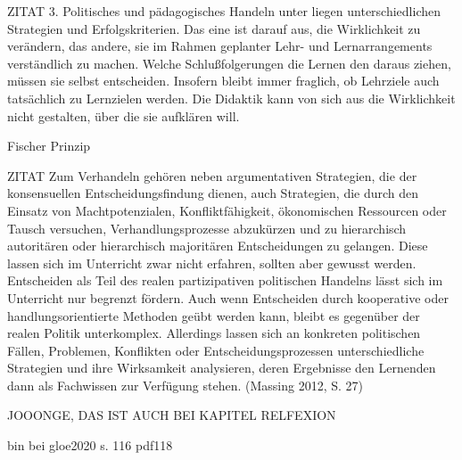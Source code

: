 ZITAT
3. Politisches und pädagogisches Handeln unter liegen unterschiedlichen Strategien und Erfolgskriterien. Das eine ist darauf aus, die Wirklichkeit zu verändern, das andere, sie im Rahmen geplanter Lehr- und Lernarrangements verständlich zu machen. Welche Schlußfolgerungen die Lernen den daraus ziehen, müssen sie selbst entscheiden. Insofern bleibt immer fraglich, ob Lehrziele auch tatsächlich zu Lernzielen werden. Die Didaktik kann von sich aus die Wirklichkeit nicht gestalten, über die sie aufklären will. \autocite[22]{Giesecke.1999}


Fischer Prinzip \autocite[]{Grammes.2005}

ZITAT
 Zum Verhandeln gehören neben argumentativen Strategien, die der konsensuellen Entscheidungsfindung dienen, auch Strategien, die durch den Einsatz von Machtpotenzialen, Konfliktfähigkeit, ökonomischen Ressourcen oder Tausch versuchen, Verhandlungsprozesse abzukürzen und zu hierarchisch autoritären oder hierarchisch majoritären Entscheidungen zu gelangen. Diese lassen sich im Unterricht zwar nicht erfahren, sollten aber gewusst werden. Entscheiden als Teil des realen partizipativen politischen Handelns lässt sich im Unterricht nur begrenzt fördern. Auch wenn Entscheiden durch kooperative oder handlungsorientierte Methoden geübt werden kann, bleibt es gegenüber der realen Politik unterkomplex. Allerdings lassen sich an konkreten politischen Fällen, Problemen, Konflikten oder Entscheidungsprozessen unterschiedliche Strategien und ihre Wirksamkeit analysieren, deren Ergebnisse den Lernenden dann als Fachwissen zur Verfügung stehen. (Massing 2012, S. 27)

JOOONGE, DAS IST AUCH BEI KAPITEL RELFEXION

bin bei gloe2020 s. 116 pdf118



